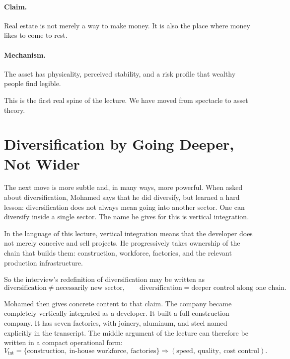 \paragraph{Claim.} Real estate is not merely a way to make money. It is also the place where money likes to come to rest.

\paragraph{Mechanism.} The asset has physicality, perceived stability, and a risk profile that wealthy people find legible.

This is the first real spine of the lecture. We have moved from spectacle to asset theory.

\section{Diversification by Going Deeper, Not Wider}

The next move is more subtle and, in many ways, more powerful. When asked about diversification, Mohamed says that he did diversify, but learned a hard lesson: diversification does not always mean going into another sector. One can diversify inside a single sector. The name he gives for this is vertical integration.

\begin{definition}
In the language of this lecture, vertical integration means that the developer does not merely conceive and sell projects. He progressively takes ownership of the chain that builds them: construction, workforce, factories, and the relevant production infrastructure.
\end{definition}

So the interview's redefinition of diversification may be written as
\begin{equation}
\text{diversification} \neq \text{necessarily new sector},
\qquad
\text{diversification} = \text{deeper control along one chain}.
\end{equation}

Mohamed then gives concrete content to that claim. The company became completely vertically integrated as a developer. It built a full construction company. It has seven factories, with joinery, aluminum, and steel named explicitly in the transcript. The middle argument of the lecture can therefore be written in a compact operational form:
\begin{equation}
V_{\text{int}}
=
\{\text{construction},\ \text{in-house workforce},\ \text{factories}\}
\Longrightarrow
(\text{speed},\ \text{quality},\ \text{cost control}).
\end{equation}

